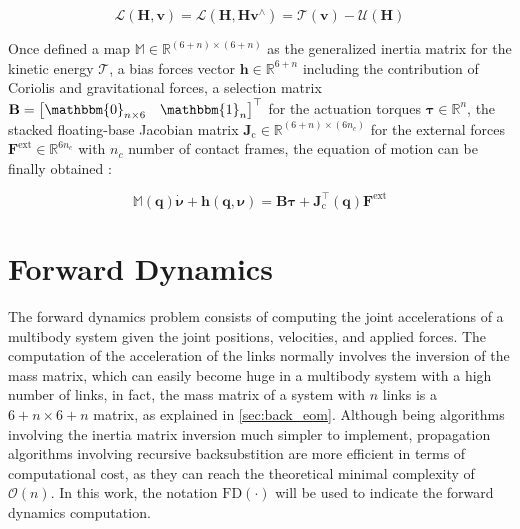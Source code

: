 \begin{equation}
    \mathcal{L}(\mathbf{H}, \mathbf{v}) = \mathcal{L}(\mathbf{H}, \mathbf{H}\mathbf{v}^\wedge) = \mathcal{T}(\mathbf{v}) - \mathcal{U}(\mathbf{H})
\end{equation}

Once defined a map $\mathbb{M} \in \mathbb{R}^{(6+n) \times (6+n)}$ as the generalized inertia matrix for the kinetic energy $\mathcal{T}$, a bias forces vector $\mathbf{h} \in \mathbb{R} ^{6+n}$ including the contribution of Coriolis and gravitational forces, a selection matrix $\mathbf{B} = \begin{bmatrix} \mathbbm{0}_{n\times6} & \mathbbm{1}_n \end{bmatrix}^\top$ for the actuation torques $\boldsymbol{\tau} \in \mathbb{R} ^n$, the stacked floating-base Jacobian matrix $\mathbf{J} _\text{c} \in \mathbb{R} ^{(6+n) \times (6n_c)}$ for the external forces $\mathbf{F} ^\text{ext} \in \mathbb{R} ^{6n_c}$ with $n_c$ number of contact frames, the equation of motion can be finally obtained \citep{siciliano_handbook_2008}:

\begin{equation}
    \label{eqn:equation_of_motion}
    \mathbb{M}(\mathbf{q}) \mathbf{\dot{\boldsymbol{\nu}}} + \mathbf{h} (\mathbf{q}, \boldsymbol{\nu}) = \mathbf{B}\boldsymbol{\tau} + \mathbf{J}^\top _\text{c}(\mathbf{q}) \mathbf{F} ^\text{ext}
\end{equation}


\section{Forward Dynamics}
\label{sec:back_fd}

The forward dynamics problem consists of computing the joint accelerations of a multibody system given the joint positions, velocities, and applied forces. The computation of the acceleration of the links normally involves the inversion of the mass matrix, which can easily become huge in a multibody system with a high number of links, in fact, the mass matrix of a system with $n$ links is a $6+n \times 6+n$ matrix, as explained in \cref{sec:back_eom}. Although being algorithms involving the inertia matrix inversion much simpler to implement, propagation algorithms involving recursive backsubstition are more efficient in terms of computational cost, as they can reach the theoretical minimal complexity of $\mathcal{O}(n)$. 
In this work, the notation $\mathrm{FD}(\cdot)$ will be used to indicate the forward dynamics computation.

